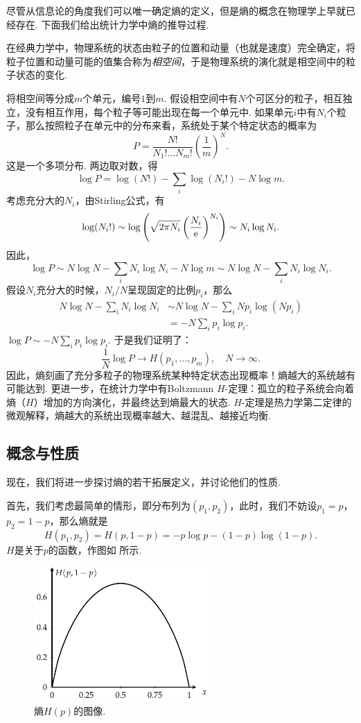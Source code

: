 尽管从信息论的角度我们可以唯一确定熵的定义，但是熵的概念在物理学上早就已经存在. 下面我们给出统计力学中熵的推导过程. 

在经典力学中，物理系统的状态由粒子的位置和动量（也就是速度）完全确定，将粒子位置和动量可能的值集合称为\textit{相空间}，于是物理系统的演化就是相空间中的粒子状态的变化. 

将相空间等分成$m$个单元，编号$1$到$m$. 假设相空间中有$N$个可区分的粒子，相互独立，没有相互作用，每个粒子等可能出现在每一个单元中. 如果单元$i$中有$N_i$个粒子，那么按照粒子在单元中的分布来看，系统处于某个特定状态的概率为
    \[P=\frac{N!}{N_1!\dots N_m!}\left(\frac1m\right)^N.\]
这是一个多项分布. 两边取对数，得
    \[\log P=\log(N!)-\sum_i\log(N_i!)-N\log m.\]
考虑充分大的$N_i$，由Stirling公式，有
\begin{align*}
    \log(N_i!)\sim\log\left(\sqrt{2\pi N_i}\left(\frac{N_i}{\mathrm{e}}\right)^{N_i}\right)\sim N_i\log N_i.    
\end{align*}
因此，
\begin{equation}
    \log P\sim N\log N-\sum_i N_i\log N_i- N\log m\sim N\log N-\sum_i N_i\log N_i.\label{eq:logP}
\end{equation}
假设$N_i$充分大的时候，$N_i/N$呈现固定的比例$p_i$，那么
    \begin{align*}
        N\log N-\sum_i N_i\log N_i&\sim N\log N-\sum_i Np_i\log(Np_i)\\
        &=-N\sum_i p_i\log p_i.
    \end{align*}
 $\log P\sim -N\sum_i p_i\log p_i$. 于是我们证明了：
    \[\frac1N\log P\to H(p_1,\dots,p_m),\quad N\to\infty.\]
因此，熵刻画了充分多粒子的物理系统某种特定状态出现概率！熵越大的系统越有可能达到. 更进一步，在统计力学中有Boltzmann $H$-定理：孤立的粒子系统会向着熵（$H$）增加的方向演化，并最终达到熵最大的状态. $H$-定理是热力学第二定律的微观解释，熵越大的系统出现概率越大、越混乱、越接近均衡.

\subsection{概念与性质}
现在，我们将进一步探讨熵的若干拓展定义，并讨论他们的性质. 

首先，我们考虑最简单的情形，即分布列为$(p_1,p_2)$，此时，我们不妨设$p_1=p$，$p_2=1-p$，那么熵就是
    \[H(p_1,p_2)=H(p,1-p)=-p\log p-(1-p)\log(1-p).\]
$H$是关于$p$的函数，作图如 所示.
\begin{figure}[ht]
        \centering
        \includegraphics[width=0.6\textwidth]{figures/information-theory/entropy-figure.pdf}
        \caption{熵$H(p)$的图像.}
        \label{fig:entropy-figure}
\end{figure}

